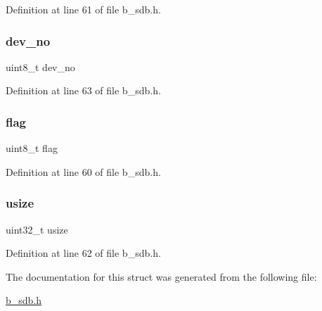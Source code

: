 Definition at line 61 of file b\+\_\+sdb.\+h.

\mbox{\label{structb_s_d_b___info__t_a858e2685fb0034acadcd8d48cf6f02b2}} 
\subsubsection{\texorpdfstring{dev\+\_\+no}{dev\_no}}
{\footnotesize\ttfamily uint8\+\_\+t dev\+\_\+no}



Definition at line 63 of file b\+\_\+sdb.\+h.

\mbox{\label{structb_s_d_b___info__t_aff31312fb16705aa73c53b945a1a6b30}} 
\subsubsection{\texorpdfstring{flag}{flag}}
{\footnotesize\ttfamily uint8\+\_\+t flag}



Definition at line 60 of file b\+\_\+sdb.\+h.

\mbox{\label{structb_s_d_b___info__t_a546dee965d95ce52190c06bfb12a5d85}} 
\subsubsection{\texorpdfstring{usize}{usize}}
{\footnotesize\ttfamily uint32\+\_\+t usize}



Definition at line 62 of file b\+\_\+sdb.\+h.



The documentation for this struct was generated from the following file\+:\begin{DoxyCompactItemize}
\item 
\mbox{\hyperlink{b__sdb_8h}{b\+\_\+sdb.\+h}}\end{DoxyCompactItemize}
